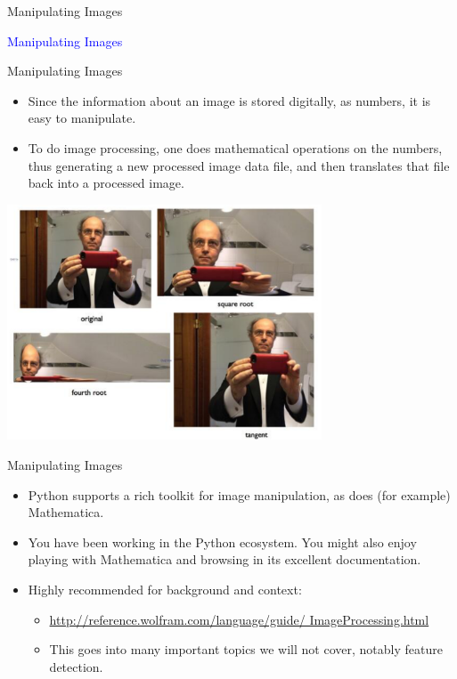 \documentclass{beamer}
\begin{document}
\begin{frame}{Manipulating Images}
   \begin{center}
      \Huge \textcolor{blue}{Manipulating Images}
   \end{center}
\end{frame}

\begin{frame}{Manipulating Images}
   \begin{itemize}
      \item Since the information about an image is stored digitally, as numbers, it is easy to manipulate.
      \item To do image processing, one does mathematical operations on the numbers, thus generating a new processed image data file, and then translates that file back into a processed image.
   \end{itemize}
   \begin{center}
      \includegraphics[width=0.7\textwidth]{figures/frank.png}
   \end{center}
\end{frame}

\begin{frame}{Manipulating Images}
   \begin{itemize}
      \item Python supports a rich toolkit for image manipulation, as does (for example) Mathematica.
      \item You have been working in the Python ecosystem. You might also enjoy playing with Mathematica and browsing in its excellent documentation.
      \item Highly recommended for background and context:
      \begin{itemize}
         \item \href{http://reference.wolfram.com/language/guide/ ImageProcessing.html}{http://reference.wolfram.com/language/guide/ ImageProcessing.html}
         \item This goes into many important topics we will not cover, notably feature detection.
      \end{itemize}
   \end{itemize}
\end{frame}
\end{document}

